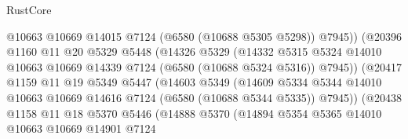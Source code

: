 \begin{lexlean}{RustCore}
\begin{coremodule}
                                    @10663
                                    @10669
                                    @14015
                                    @7124
                                    (@6580 (@10688 @5305 @5298))
                                    @7945))
                                (@20396
                                  @1160
                                  @11
                                  @20
                                  @5329
                                  @5448
                                  (@14326
                                    @5329
                                    (@14332
                                      @5315
                                      @5324
                                      @14010
                                      @10663
                                      @10669
                                      @14339
                                      @7124
                                      (@6580 (@10688 @5324 @5316))
                                      @7945))
                                  (@20417
                                    @1159
                                    @11
                                    @19
                                    @5349
                                    @5447
                                    (@14603
                                      @5349
                                      (@14609
                                        @5334
                                        @5344
                                        @14010
                                        @10663
                                        @10669
                                        @14616
                                        @7124
                                        (@6580 (@10688 @5344 @5335))
                                        @7945))
                                    (@20438
                                      @1158
                                      @11
                                      @18
                                      @5370
                                      @5446
                                      (@14888
                                        @5370
                                        (@14894
                                          @5354
                                          @5365
                                          @14010
                                          @10663
                                          @10669
                                          @14901
                                          @7124

\end{coremodule}
\end{lexlean}
